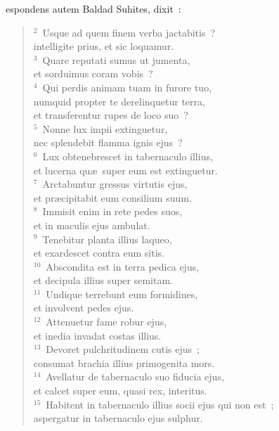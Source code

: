 \bchapter
{}espondens autem Baldad Suhites, dixit~:
\begin{flushleft}\begin{verse}\vspace{6pt}${}^{2}$~Usque ad quem finem verba jactabitis~?\\ intelligite prius, et sic loquamur.\\
${}^{3}$~Quare reputati sumus ut jumenta,\\ et sorduimus coram vobis~?\\
${}^{4}$~Qui perdis animam tuam in furore tuo,\\ numquid propter te derelinquetur terra,\\ et transferentur rupes de loco suo~?\\
${}^{5}$~Nonne lux impii extinguetur,\\ nec splendebit flamma ignis ejus~?\\
${}^{6}$~Lux obtenebrescet in tabernaculo illius,\\ et lucerna qu\ae\ super eum est extinguetur.\\
${}^{7}$~Arctabuntur gressus virtutis ejus,\\ et pr\ae cipitabit eum consilium suum.\\
${}^{8}$~Immisit enim in rete pedes suos,\\ et in maculis ejus ambulat.\\
${}^{9}$~Tenebitur planta illius laqueo,\\ et exardescet contra eum sitis.\\
${}^{10}$~Abscondita est in terra pedica ejus,\\ et decipula illius super semitam.\\
${}^{11}$~Undique terrebunt eum formidines,\\ et involvent pedes ejus.\\
${}^{12}$~Attenuetur fame robur ejus,\\ et inedia invadat costas illius.\\
${}^{13}$~Devoret pulchritudinem cutis ejus~;\\ consumat brachia illius primogenita mors.\\
${}^{14}$~Avellatur de tabernaculo suo fiducia ejus,\\ et calcet super eum, quasi rex, interitus.\\
${}^{15}$~Habitent in tabernaculo illius socii ejus qui non est~;\\ aspergatur in tabernaculo ejus sulphur.\\

\end{verse}
\end{flushleft}
